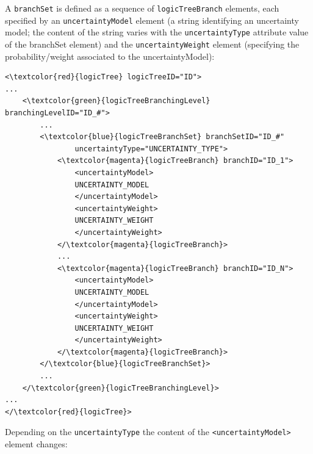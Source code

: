 A \Verb+branchSet+ is defined as a sequence of \Verb+logicTreeBranch+ 
elements, each specified by an \Verb+uncertaintyModel+ element (a string 
identifying an uncertainty mod\-el; the content of the string varies with
the \texttt{uncertaintyType} attribute value of the branchSet element) 
and the \texttt{uncertaintyWeight} element (specifying the probability/weight associated to the uncertaintyModel):
\begin{Verbatim}[frame=single, commandchars=\\\{\}]
<\textcolor{red}{logicTree} logicTreeID="ID">
...
	<\textcolor{green}{logicTreeBranchingLevel} branchingLevelID="ID_#">
		...
		<\textcolor{blue}{logicTreeBranchSet} branchSetID="ID_#"
				uncertaintyType="UNCERTAINTY_TYPE">
			<\textcolor{magenta}{logicTreeBranch} branchID="ID_1">
				<uncertaintyModel>
				UNCERTAINTY_MODEL
				</uncertaintyModel>
				<uncertaintyWeight>
				UNCERTAINTY_WEIGHT
				</uncertaintyWeight>
			</\textcolor{magenta}{logicTreeBranch}>
			...
			<\textcolor{magenta}{logicTreeBranch} branchID="ID_N">
				<uncertaintyModel>
				UNCERTAINTY_MODEL
				</uncertaintyModel>
				<uncertaintyWeight>
				UNCERTAINTY_WEIGHT
				</uncertaintyWeight>
			</\textcolor{magenta}{logicTreeBranch}>
		</\textcolor{blue}{logicTreeBranchSet}>
		...
	</\textcolor{green}{logicTreeBranchingLevel}>
...
</\textcolor{red}{logicTree}>
\end{Verbatim}
Depending on the \Verb+uncertaintyType+ the content of the 
\Verb+<uncertaintyModel>+ element changes:
